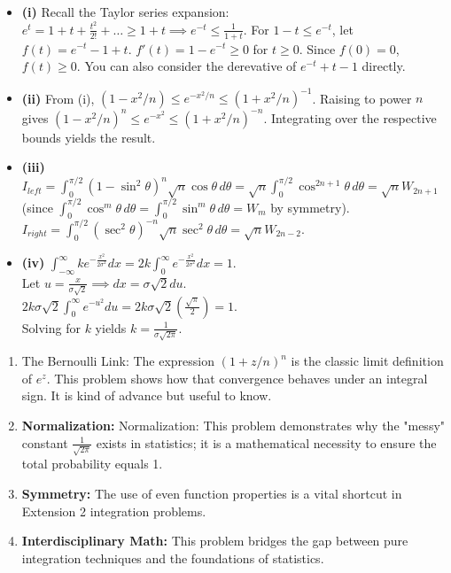 \begin{solution}
\begin{itemize}
   \item \textbf{(i)} Recall the Taylor series expansion: 
   $e^t = 1 + t + \frac{t^2}{2!} + \dots \ge 1+t \implies e^{-t} \le \frac{1}{1+t}$. For $1-t \le e^{-t}$, let $f(t) = e^{-t} - 1 + t$. $f'(t) = 1 - e^{-t} \ge 0$ for $t \ge 0$. Since $f(0)=0$, $f(t) \ge 0$.
   You can also consider the derevative of $e^{-t} + t - 1$ directly.
   \item \textbf{(ii)}
   From (i), $(1-x^2/n) \le e^{-x^2/n} \le (1+x^2/n)^{-1}$. Raising to power $n$ gives $(1-x^2/n)^n \le e^{-x^2} \le (1+x^2/n)^{-n}$. Integrating over the respective bounds yields the result.
   \item \textbf{(iii)} 
   $I_{left} = \int_0^{\pi/2} (1-\sin^2\theta)^n \sqrt{n}\cos\theta \, d\theta = \sqrt{n} \int_0^{\pi/2} \cos^{2n+1}\theta \, d\theta = \sqrt{n}W_{2n+1}$ (since $\int_0^{\pi/2} \cos^m \theta \, d\theta = \int_0^{\pi/2} \sin^m \theta \, d\theta = W_m$ by symmetry). $I_{right} = \int_0^{\pi/2} (\sec^2\theta)^{-n} \sqrt{n}\sec^2\theta \, d\theta = \sqrt{n}W_{2n-2}$.
   \item \textbf{(iv)} $\int_{-\infty}^{\infty} k e^{-\frac{x^2}{2\sigma^2}} dx = 2k \int_{0}^{\infty} e^{-\frac{x^2}{2\sigma^2}} dx = 1$. \\
   Let $u = \frac{x}{\sigma\sqrt{2}} \implies dx = \sigma\sqrt{2} du$. \\
   $2k\sigma\sqrt{2} \int_{0}^{\infty} e^{-u^2} du = 2k\sigma\sqrt{2} \left( \frac{\sqrt{\pi}}{2} \right) = 1$. \\
   Solving for $k$ yields $k = \frac{1}{\sigma\sqrt{2\pi}}$.
\end{itemize}
\end{solution}

\begin{takeaways}
\begin{enumerate}
    \item The Bernoulli Link: The expression $(1 + z/n)^n$ is the classic limit definition of $e^z$. This problem shows how that convergence behaves under an integral sign. It is kind of advance but useful to know.
   \item \textbf{Normalization:} Normalization: This problem demonstrates why the "messy" constant $\frac{1}{\sqrt{2\pi}}$ exists in statistics; it is a mathematical necessity to ensure the total probability equals 1.
   \item \textbf{Symmetry:} The use of even function properties is a vital shortcut in Extension 2 integration problems.
   \item \textbf{Interdisciplinary Math:} This problem bridges the gap between pure integration techniques and the foundations of statistics.
\end{enumerate}
\end{takeaways}

